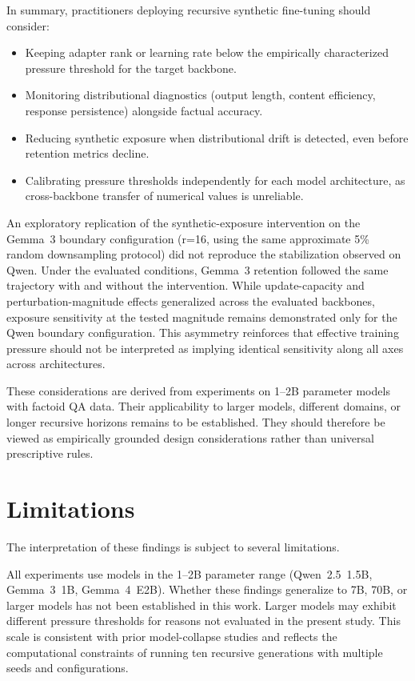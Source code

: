 \documentclass[a4paper,fleqn]{cas-dc}
\begin{document}
In summary, practitioners deploying recursive synthetic fine-tuning should
consider:
\begin{itemize}
    \item Keeping adapter rank or learning rate below the empirically
    characterized pressure threshold for the target backbone.
    \item Monitoring distributional diagnostics (output length, content
    efficiency, response persistence) alongside factual accuracy.
    \item Reducing synthetic exposure when distributional drift is detected,
    even before retention metrics decline.
    \item Calibrating pressure thresholds independently for each model
    architecture, as cross-backbone transfer of numerical values is unreliable.
\end{itemize}

An exploratory replication of the synthetic-exposure intervention on the
Gemma~3 boundary configuration (r=16, using the same approximate 5\% random
downsampling protocol) did not reproduce the stabilization observed on Qwen.
Under the evaluated conditions, Gemma~3 retention followed the same
trajectory with and without the intervention. While update-capacity and
perturbation-magnitude effects generalized across the evaluated backbones,
exposure sensitivity at the tested magnitude remains demonstrated only for
the Qwen boundary configuration. This asymmetry reinforces that effective
training pressure should not be interpreted as implying identical sensitivity
along all axes across architectures.

These considerations are derived from experiments on 1--2B parameter models with
factoid QA data. Their applicability to larger models, different domains, or
longer recursive horizons remains to be established. They should therefore be
viewed as empirically grounded design considerations rather than universal
prescriptive rules.

\section{Limitations}\label{sec:limitations}

The interpretation of these findings is subject to several limitations.

All experiments use models in the 1--2B parameter range (Qwen~2.5~1.5B,
Gemma~3~1B, Gemma~4~E2B). Whether these findings generalize to 7B, 70B, or
larger models has not been established in this work. Larger models may exhibit
different pressure thresholds for reasons not evaluated in the present study.
This scale is consistent with prior model-collapse studies
\citep{shumailov2024,keisha2025} and reflects the computational constraints of
running ten recursive generations with multiple seeds and configurations.
\end{document}
